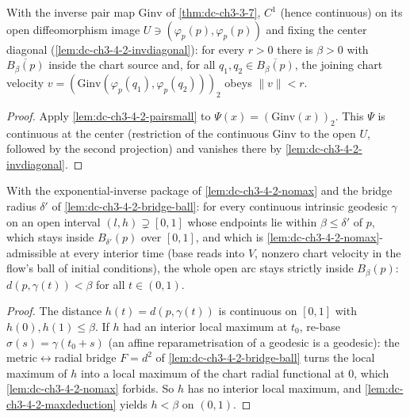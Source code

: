 \begin{lemma}
  \label{lem:dc-ch3-4-2-velsmall}
  \leanok
  With the inverse pair map $\mathrm{Ginv}$ of \cref{thm:dc-ch3-3-7}, $C^1$ (hence
  continuous) on its open diffeomorphism image $U\ni(\varphi_p(p),\varphi_p(p))$ and
  fixing the center diagonal (\cref{lem:dc-ch3-4-2-invdiagonal}): for every $r>0$
  there is $\beta>0$ with $\overline{B_\beta(p)}$ inside the chart source and, for all
  $q_1,q_2\in\overline{B_\beta(p)}$, the joining chart velocity
  $v=(\mathrm{Ginv}(\varphi_p(q_1),\varphi_p(q_2)))_2$ obeys $\|v\|<r$.
\end{lemma}
\begin{proof}
  \sketch
  \leanok
  Apply \cref{lem:dc-ch3-4-2-pairsmall} to $\Psi(x)=(\mathrm{Ginv}(x))_2$. This
  $\Psi$ is continuous at the center (restriction of the continuous $\mathrm{Ginv}$
  to the open $U$, followed by the second projection) and vanishes there by
  \cref{lem:dc-ch3-4-2-invdiagonal}.
\end{proof}

\begin{lemma}
  \label{lem:dc-ch3-4-2-interior}
  \leanok
  With the exponential-inverse package of \cref{lem:dc-ch3-4-2-nomax} and the bridge radius $\delta'$ of
  \cref{lem:dc-ch3-4-2-bridge-ball}: for every continuous intrinsic geodesic $\gamma$ on an open interval
  $(l,h)\supsetneq[0,1]$ whose endpoints lie within $\beta\le\delta'$ of $p$, which stays inside
  $B_{\delta'}(p)$ over $[0,1]$, and which is \cref{lem:dc-ch3-4-2-nomax}-admissible at every interior
  time (base reads into $V$, nonzero chart velocity in the flow's ball of initial conditions), the whole
  open arc stays strictly inside $B_\beta(p)$: $d(p,\gamma(t))<\beta$ for all $t\in(0,1)$.
\end{lemma}
\begin{proof}
  \sketch
  \leanok
  The distance $h(t)=d(p,\gamma(t))$ is continuous on $[0,1]$ with $h(0),h(1)\le\beta$. If $h$ had an
  interior local maximum at $t_0$, re-base $\sigma(s)=\gamma(t_0+s)$ (an affine reparametrisation of a
  geodesic is a geodesic): the metric$\leftrightarrow$radial bridge $F=d^2$ of
  \cref{lem:dc-ch3-4-2-bridge-ball} turns the local maximum of $h$ into a local maximum of the chart
  radial functional at $0$, which \cref{lem:dc-ch3-4-2-nomax} forbids. So $h$ has no interior local
  maximum, and \cref{lem:dc-ch3-4-2-maxdeduction} yields $h<\beta$ on $(0,1)$.
\end{proof}

